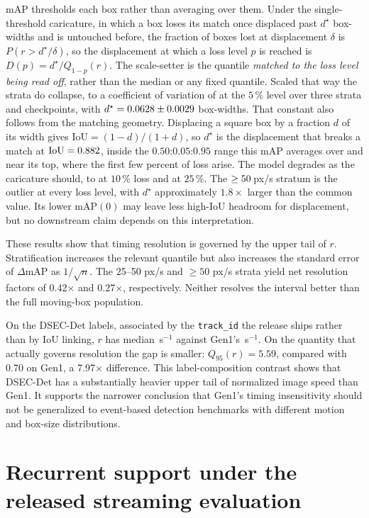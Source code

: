 \documentclass[10pt,twocolumn,letterpaper]{article}
\begin{document}
mAP thresholds each box rather than averaging over them. Under the single-threshold
caricature, in which a box loses its match once displaced past $d^{\star}$ box-widths and is
untouched before, the fraction of boxes lost at displacement $\delta$ is
$P(r > d^{\star}/\delta)$, so the displacement at which a loss level $p$ is reached is
$D(p) = d^{\star} / Q_{1-p}(r)$. The scale-setter is the quantile \emph{matched to the loss
level being read off}, rather than the median or any fixed quantile. Scaled that way the strata
do collapse, to a coefficient of variation of \collapseCV{} at the $5\,\%$ level over three
strata and \rankCkpts{} checkpoints, with $d^{\star} = 0.0628 \pm 0.0029$
box-widths. That constant also follows from the matching geometry. Displacing a square box by a
fraction $d$ of its width gives $\mathrm{IoU} = (1-d)/(1+d)$, so $d^{\star}$ is the
displacement that breaks a match at $\mathrm{IoU} = 0.882$, inside the
$0.50$:$0.05$:$0.95$ range this mAP averages over and near its top, where the first few
percent of loss arise. The model degrades as the caricature should, to \collapseCVten{}
at $10\,\%$ loss and \collapseCVqtr{} at $25\,\%$. The $\geq50\,$px/s stratum is the
outlier at every loss level, with $d^{\star}$ approximately $1.8\times$ larger than the common
value. Its lower mAP$(0)$ may leave less high-IoU headroom for displacement, but no downstream
claim depends on this interpretation.

These results show that timing resolution is governed by the upper tail of $r$. Stratification
increases the relevant quantile but also increases the standard error of $\Delta$mAP as
$1/\sqrt{n}$. The 25--50 px/s and $\geq 50$ px/s strata yield net resolution factors of
0.42$\times$ and 0.27$\times$, respectively. Neither resolves the interval better than the
full moving-box population.

On the DSEC-Det labels, associated by the \texttt{track\_id} the release ships
rather than by IoU linking, $r$ has median \rDsecTrain\,s$^{-1}$ against Gen1's
\rGenAll\,s$^{-1}$. On the quantity that actually governs resolution the gap is smaller:
$Q_{95}(r)=5.59$, compared with 0.70 on Gen1, a 7.97$\times$ difference. This
label-composition contrast shows that DSEC-Det has a substantially heavier upper tail of
normalized image speed than Gen1. It supports the narrower conclusion that Gen1's timing
insensitivity should not be generalized to event-based detection benchmarks with different
motion and box-size distributions.

\section{Recurrent support under the released streaming evaluation}
\end{document}
